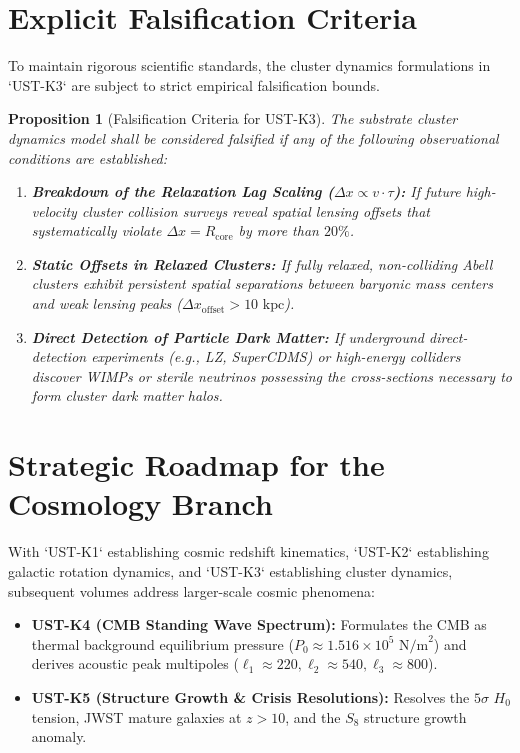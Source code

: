 \documentclass[11pt,a4paper]{article}
\newtheorem{prop}{Proposition}
\begin{document}
	\section{Explicit Falsification Criteria}
	\label{sec:falsification_tests}
	
	To maintain rigorous scientific standards, the cluster dynamics formulations in `UST-K3` are subject to strict empirical falsification bounds.
	
	\begin{prop}[Falsification Criteria for UST-K3]
		\label{prop:falsification_bounds_k3}
		The substrate cluster dynamics model shall be considered falsified if any of the following observational conditions are established:
		\begin{enumerate}
			\item \textbf{Breakdown of the Relaxation Lag Scaling ($\Delta x \propto v \cdot \tau$):} If future high-velocity cluster collision surveys reveal spatial lensing offsets that systematically violate $\Delta x = R_{\text{core}}$ by more than $20\%$.
			\item \textbf{Static Offsets in Relaxed Clusters:} If fully relaxed, non-colliding Abell clusters exhibit persistent spatial separations between baryonic mass centers and weak lensing peaks ($\Delta x_{\text{offset}} > 10 \text{ kpc}$).
			\item \textbf{Direct Detection of Particle Dark Matter:} If underground direct-detection experiments (e.g., LZ, SuperCDMS) or high-energy colliders discover WIMPs or sterile neutrinos possessing the cross-sections necessary to form cluster dark matter halos.
		\end{enumerate}
	\end{prop}
	
	\section{Strategic Roadmap for the Cosmology Branch}
	\label{sec:cosmo_roadmap}
	
	With `UST-K1` \cite{USTK1} establishing cosmic redshift kinematics, `UST-K2` \cite{USTK2} establishing galactic rotation dynamics, and `UST-K3` establishing cluster dynamics, subsequent volumes address larger-scale cosmic phenomena:
	\begin{itemize}
		\item \textbf{UST-K4 (CMB Standing Wave Spectrum):} Formulates the CMB as thermal background equilibrium pressure ($P_0 \approx 1.516 \times 10^5 \text{ N/m}^2$) and derives acoustic peak multipoles ($\ell_1 \approx 220, \ell_2 \approx 540, \ell_3 \approx 800$).
		\item \textbf{UST-K5 (Structure Growth \& Crisis Resolutions):} Resolves the $5\sigma$ $H_0$ tension, JWST mature galaxies at $z > 10$, and the $S_8$ structure growth anomaly.
	\end{itemize}
	
\end{document}
